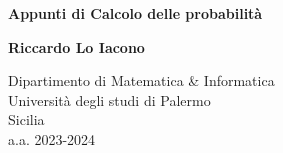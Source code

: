 \documentclass{subfiles}
\begin{document}
\begin{titlepage}
    \begin{center}
        \vspace*{1cm}

        \textbf{Appunti di Calcolo delle probabilità}

        \vspace{1.5cm}

        \textbf{Riccardo Lo Iacono}

        \vfill

        \vspace{0.8cm}

        Dipartimento di Matematica \& Informatica\\
        Università degli studi di Palermo\\
        Sicilia\\
        a.a. 2023-2024

    \end{center}
\end{titlepage}
\end{document}
